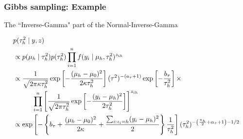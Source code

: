 \documentclass{beamer}
\begin{document}
\begin{frame}[fragile]
\frametitle{Gibbs sampling: Example}

The ``Inverse-Gamma" part of the Normal-Inverse-Gamma 

\begin{align*}
&p(\tau^2_h \mid  y, z) \\
&\propto p(\mu_h \mid \tau^2_{h})p(\tau^2_{h})  \prod_{i=1}^n   f(y_i \mid \mu_h, \tau^2_h)^{z_{ih}}\\
&\propto \frac{1}{\sqrt{2\pi \kappa \tau_h^2  }}\exp\left[-\frac{(\mu_{h} -  \mu_0)^2 }{ 2\kappa \tau_h^2 } \right] (\tau^2)^{-(a_{\tau}+1) } \exp\left[ - \frac{b_{\tau}}{\tau_h^2} \right] \times\\
&\hspace{10mm}\prod_{i=1}^n \left[ \frac{1}{\sqrt{2\pi \tau^2_{h} }}\exp\left[-\frac{(y_i - \mu_{h} )^2 }{ 2\tau^2_{h} } \right] \right]^{z_{ih}} \\
&\propto \exp\left[-\left\{ b_\tau +  \frac{(\mu_{h} -  \mu_0)^2 }{ 2\kappa  }  + \frac{\sum_{i : z_i = h}(y_i - \mu_{h} )^2 }{ 2 } \right\} \frac{1}{\tau^2_h} \right] (\tau_h^2)^{-\left( \frac{n_h}{2} + \alpha_{\tau} + 1 \right)-1/2 }
\end{align*}

\end{frame}
\end{document}
